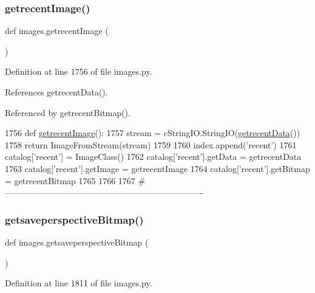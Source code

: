 \subsubsection{\texorpdfstring{getrecent\+Image()}{getrecentImage()}}
{\footnotesize\ttfamily def images.\+getrecent\+Image (\begin{DoxyParamCaption}{ }\end{DoxyParamCaption})}



Definition at line 1756 of file images.\+py.



References getrecent\+Data().



Referenced by getrecent\+Bitmap().


\begin{DoxyCode}
1756 \textcolor{keyword}{def }\hyperlink{namespaceimages_aee17f3301429c42b24577517bb7a12bd}{getrecentImage}():
1757     stream = cStringIO.StringIO(\hyperlink{namespaceimages_a9d897eaa85415fba9658c4642f1f2152}{getrecentData}())
1758     \textcolor{keywordflow}{return} ImageFromStream(stream)
1759 
1760 index.append(\textcolor{stringliteral}{'recent'})
1761 catalog[\textcolor{stringliteral}{'recent'}] = ImageClass()
1762 catalog[\textcolor{stringliteral}{'recent'}].getData = getrecentData
1763 catalog[\textcolor{stringliteral}{'recent'}].getImage = getrecentImage
1764 catalog[\textcolor{stringliteral}{'recent'}].getBitmap = getrecentBitmap
1765 
1766 
1767 \textcolor{comment}{#----------------------------------------------------------------------}
\end{DoxyCode}
\mbox{\label{namespaceimages_a1837442bb3b6afc1d9c2bf47de0212d6}} 
\subsubsection{\texorpdfstring{getsaveperspective\+Bitmap()}{getsaveperspectiveBitmap()}}
{\footnotesize\ttfamily def images.\+getsaveperspective\+Bitmap (\begin{DoxyParamCaption}{ }\end{DoxyParamCaption})}



Definition at line 1811 of file images.\+py.



